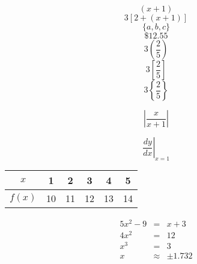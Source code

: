 \documentclass[11pt]{article}
\begin{document}
$$(x+1)$$
$$3[2+(x+1)]$$
$$\{a,b,c\}$$
$$\$12.55$$
$$3\left(\frac{2}{5}\right)$$
$$3\left[\frac{2}{5}\right]$$
$$3\left\{\frac{2}{5}\right\}$$

$$\left|\frac{x}{x+1}\right|$$

$$\left. \frac{dy}{dx} \right|_{x=1}$$

\begin{tabular}{|c|c|c|c|c|c|}

\hline
$x$ & 1 & 2 & 3 & 4 & 5 \\ \hline
$f(x)$ & 10 &11& 12&13&14\\ \hline

\end{tabular}

\begin{eqnarray}
5x^2-9&=&x+3\\
4x^2&=&12\\
x^3&=&3\\
x&\approx&\pm1.732
\end{eqnarray}
\end{document}
